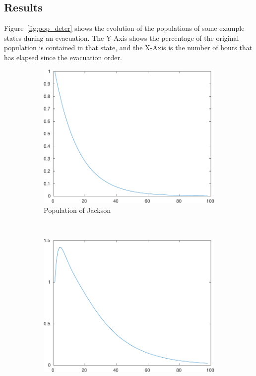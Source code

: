 \documentclass[titlepage]{article}
\begin{document}
  \subsection{Results}
      Figure~\ref{fig:pop_deter} shows the evolution of the populations of some example states during an evacuation. The Y-Axis shows the percentage of the original population is contained in that state, and the X-Axis is the number of hours that has elapsed since the evacuation order.
    \begin{figure}[H]
      \center
      \begin{subfigure}[b]{0.3\textwidth}
        \center
        \includegraphics[width=\textwidth]{figures/pop_county_29-crop.pdf}
        \caption{Population of Jackson}
        \label{fig:pop_county60}
      \end{subfigure}~
      \begin{subfigure}[b]{0.3\textwidth}
        \center
        \includegraphics[width=\textwidth]{figures/pop_county_39-crop.pdf}

\end{subfigure}
\end{figure}
\end{document}
